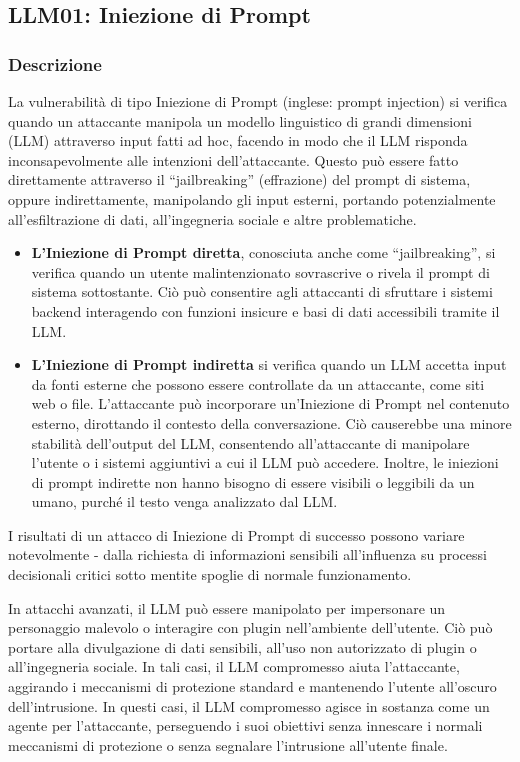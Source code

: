 \documentclass[
]{article}
\author{}
\date{}
\begin{document}
\subsection{LLM01: Iniezione di Prompt}\label{llm01-iniezione-di-prompt}

\subsubsection{Descrizione}\label{descrizione}

La vulnerabilità di tipo Iniezione di Prompt (inglese: prompt injection)
si verifica quando un attaccante manipola un modello linguistico di
grandi dimensioni (LLM) attraverso input fatti ad hoc, facendo in modo
che il LLM risponda inconsapevolmente alle intenzioni dell'attaccante.
Questo può essere fatto direttamente attraverso il ``jailbreaking''
(effrazione) del prompt di sistema, oppure indirettamente, manipolando
gli input esterni, portando potenzialmente all'esfiltrazione di dati,
all'ingegneria sociale e altre problematiche.

\begin{itemize}
\item
  \textbf{L'Iniezione di Prompt diretta}, conosciuta anche come
  ``jailbreaking'', si verifica quando un utente malintenzionato
  sovrascrive o rivela il prompt di sistema sottostante. Ciò può
  consentire agli attaccanti di sfruttare i sistemi backend interagendo
  con funzioni insicure e basi di dati accessibili tramite il LLM.
\item
  \textbf{L'Iniezione di Prompt indiretta} si verifica quando un LLM
  accetta input da fonti esterne che possono essere controllate da un
  attaccante, come siti web o file. L'attaccante può incorporare
  un'Iniezione di Prompt nel contenuto esterno, dirottando il contesto
  della conversazione. Ciò causerebbe una minore stabilità dell'output
  del LLM, consentendo all'attaccante di manipolare l'utente o i sistemi
  aggiuntivi a cui il LLM può accedere. Inoltre, le iniezioni di prompt
  indirette non hanno bisogno di essere visibili o leggibili da un
  umano, purché il testo venga analizzato dal LLM.
\end{itemize}

I risultati di un attacco di Iniezione di Prompt di successo possono
variare notevolmente - dalla richiesta di informazioni sensibili
all'influenza su processi decisionali critici sotto mentite spoglie di
normale funzionamento.

In attacchi avanzati, il LLM può essere manipolato per impersonare un
personaggio malevolo o interagire con plugin nell'ambiente dell'utente.
Ciò può portare alla divulgazione di dati sensibili, all'uso non
autorizzato di plugin o all'ingegneria sociale. In tali casi, il LLM
compromesso aiuta l'attaccante, aggirando i meccanismi di protezione
standard e mantenendo l'utente all'oscuro dell'intrusione. In questi
casi, il LLM compromesso agisce in sostanza come un agente per
l'attaccante, perseguendo i suoi obiettivi senza innescare i normali
meccanismi di protezione o senza segnalare l'intrusione all'utente
finale.
\end{document}
